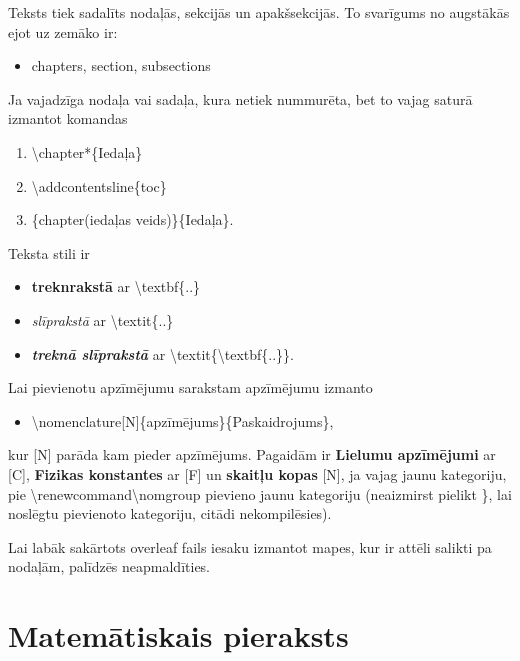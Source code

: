 \documentclass[12pt]{report}%
\theoremstyle{definition}
\begin{document}
Teksts tiek sadalīts nodaļās, sekcijās un apakšsekcijās. To svarīgums no augstākās ejot uz zemāko ir:
\begin{itemize}
    \item chapters, section, subsections
\end{itemize}
Ja vajadzīga nodaļa vai sadaļa, kura netiek nummurēta, bet to vajag saturā izmantot komandas
\begin{enumerate}
    \item \textbackslash chapter*\{Iedaļa\}
    \item \textbackslash addcontentsline\{toc\}
    \item \{chapter(iedaļas veids)\}\{Iedaļa\}.
\end{enumerate}


\noindent Teksta stili ir
\begin{itemize}
    \item \textbf{treknrakstā} ar \textbackslash textbf\{..\}
    \item \textit{slīprakstā} ar \textbackslash textit\{..\}
    \item \textit{\textbf{treknā slīprakstā}} ar \textbackslash textit\{\textbackslash textbf\{..\}\}.
\end{itemize}



\noindent Lai pievienotu apzīmējumu sarakstam apzīmējumu izmanto
\begin{itemize}
    \item \textbackslash nomenclature[N]\{apzīmējums\}\{Paskaidrojums\},
\end{itemize}
kur [N] parāda kam pieder apzīmējums. Pagaidām ir \textbf{Lielumu apzīmējumi} ar [C], \textbf{Fizikas konstantes} ar [F] un \textbf{skaitļu kopas} [N], ja vajag jaunu kategoriju, pie \textbackslash renewcommand\textbackslash nomgroup pievieno jaunu kategoriju (neaizmirst pielikt \}, lai noslēgtu pievienoto kategoriju, citādi nekompilēsies).

Lai labāk sakārtots overleaf fails iesaku izmantot mapes, kur ir attēli salikti pa nodaļām, palīdzēs neapmaldīties.
\section{Matemātiskais pieraksts}
\end{document}
